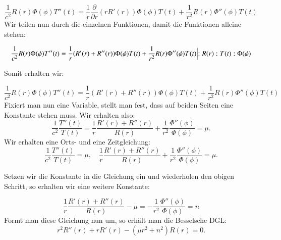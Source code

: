 \begin{equation}
\frac{1}{c^2} R(r) \Phi(\phi) T''(t) = \frac{1}{r} \frac{\partial}{\partial r}(r R'(r)) \Phi(\phi) T(t) + \frac{1}{r^2} R(r) \Phi''(\phi) T(t)
\end{equation}
Wir teilen nun durch die einzelnen Funktionen, damit die Funktionen alleine stehen:

\begin{equation}
\frac{1}{c^2} R(r) \Phi(\phi) T''(t) = \frac{1}{r}(R'(r) + R''(r)) \Phi(\phi) T(t) + \frac{1}{r^2} R(r) \Phi''(\phi) T(t)
\Bigl\lvert
:R(r) : T(t) :\Phi(\phi)
\end{equation}

Somit erhalten wir:

\begin{equation}
\frac{1}{c^2} R(r) \Phi(\phi) T''(t) = \frac{1}{r} (R'(r) + R''(r)) \Phi(\phi) T(t) + \frac{1}{r^2} R(r) \Phi''(\phi) T(t)
\end{equation}
Fixiert man nun eine Variable, stellt man fest, dass auf beiden Seiten eine Konstante stehen muss. Wir erhalten also:
\begin{equation}
\frac{1}{c^2}
\frac{T''(t)}{T(t)} = 
\frac{1}{r} 
\frac{R'(r) + R''(r)}{R(r)} + 
\frac{1}{r^2}
\frac{\Phi''(\phi)}{\Phi(\phi)} = \mu.
\end{equation}
Wir erhalten eine Orts- und eine Zeitgleichung:
\begin{equation}
\frac{1}{c^2} 
\frac{T''(t)}{T(t)} = 
\mu
,\quad
\frac{1}{r} \frac{R'(r) + R''(r)}{R(r)} + 
\frac{1}{r^2} \frac{\Phi''(\phi)}{\Phi(\phi)} = 
\mu
.
\end{equation}

Setzen wir die Konstante in die Gleichung ein und wiederholen den obigen Schritt, so erhalten wir eine weitere Konstante:

\begin{equation}
\frac{1}{r} \frac{R'(r) + R''(r)}{R(r)} - \mu =
-\frac{1}{r^2} \frac{\Phi''(\phi)}{\Phi(\phi)} = n
\end{equation}
Formt man diese Gleichung nun um, so erhält man die Besselsche DGL:
\begin{equation}
r^2 R''(r) + r R'(r) - (\mu r^2 + n^2)R(r) = 0
\label{eq:besselsche_dgl}
.
\end{equation}
